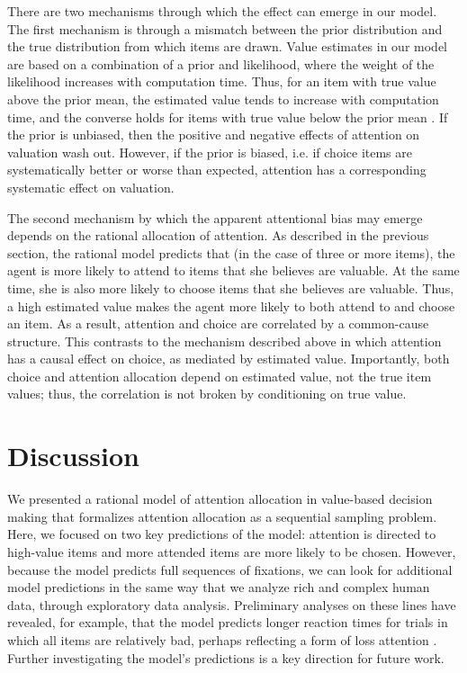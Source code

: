 \documentclass[11pt]{article} %
\begin{document}
There are two mechanisms through which the effect can emerge in our model. The first mechanism is through a mismatch between the prior distribution and the true distribution from which items are drawn. Value estimates in our model are based on a combination of a prior and likelihood, where the weight of the likelihood increases with computation time. Thus, for an item with true value above the prior mean, the estimated value tends to increase with computation time, and the converse holds for items with true value below the prior mean \citep{Armel2008}. If the prior is unbiased, then the positive and negative effects of attention on valuation wash out. However, if the prior is biased, i.e. if choice items are systematically better or worse than expected, attention has a corresponding systematic effect on valuation.

The second mechanism by which the apparent attentional bias may emerge depends on the rational allocation of attention. As described in the previous section, the rational model predicts that (in the case of three or more items), the agent is more likely to attend to items that she believes are valuable. At the same time, she is also more likely to choose items that she believes are valuable. Thus, a high estimated value makes the agent more likely to both attend to and choose an item. As a result, attention and choice are correlated by a common-cause structure. This contrasts to the mechanism described above in which attention has a causal effect on choice, as mediated by estimated value. Importantly, both choice and attention allocation depend on estimated value, not the true item values; thus, the correlation is not broken by conditioning on true value.


\section{Discussion}
We presented a rational model of attention allocation in value-based decision making that formalizes attention allocation as a sequential sampling problem. Here, we focused on two key predictions of the model: attention is directed to high-value items and more attended items are more likely to be chosen. However, because the model predicts full sequences of fixations, we can look for additional model predictions in the same way that we analyze rich and complex human data, through exploratory data analysis. Preliminary analyses on these lines have revealed, for example, that the model predicts longer reaction times for trials in which all items are relatively bad, perhaps reflecting a form of loss attention \citep{yechiam2013losses}. Further investigating the model's predictions is a key direction for future work.
\end{document}
